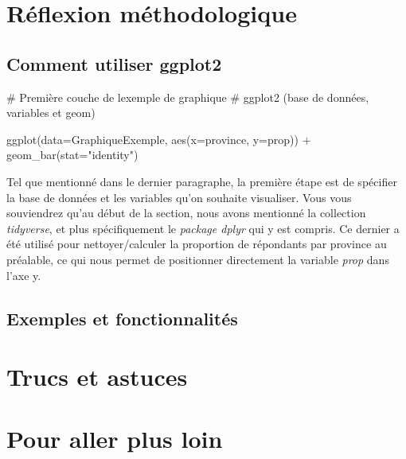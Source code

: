 \documentclass[
  letterpaper,
]{scrbook}
\newenvironment{Shaded}{\begin{snugshade}}{\end{snugshade}}
\newcommand{\AttributeTok}[1]{\textcolor[rgb]{0.40,0.45,0.13}{#1}}
\newcommand{\CommentTok}[1]{\textcolor[rgb]{0.37,0.37,0.37}{#1}}
\newcommand{\FunctionTok}[1]{\textcolor[rgb]{0.28,0.35,0.67}{#1}}
\newcommand{\NormalTok}[1]{\textcolor[rgb]{0.00,0.23,0.31}{#1}}
\newcommand{\SpecialCharTok}[1]{\textcolor[rgb]{0.37,0.37,0.37}{#1}}
\newcommand{\StringTok}[1]{\textcolor[rgb]{0.13,0.47,0.30}{#1}}
\begin{document}
\hypertarget{ruxe9flexion-muxe9thodologique}{%
\section{Réflexion
méthodologique}\label{ruxe9flexion-muxe9thodologique}}

\hypertarget{comment-utiliser-ggplot2}{%
\subsection{Comment utiliser ggplot2}\label{comment-utiliser-ggplot2}}

\begin{Shaded}
\begin{Highlighting}[]
\CommentTok{\# Première couche de l\textquotesingle{}exemple de graphique}
\CommentTok{\# ggplot2 (base de données, variables et geom)}

\FunctionTok{ggplot}\NormalTok{(}\AttributeTok{data=}\NormalTok{GraphiqueExemple, }\FunctionTok{aes}\NormalTok{(}\AttributeTok{x=}\NormalTok{province, }\AttributeTok{y=}\NormalTok{prop)) }\SpecialCharTok{+}
  \FunctionTok{geom\_bar}\NormalTok{(}\AttributeTok{stat=}\StringTok{"identity"}\NormalTok{) }
\end{Highlighting}
\end{Shaded}

Tel que mentionné dans le dernier paragraphe, la première étape est de
spécifier la base de données et les variables qu'on souhaite visualiser.
Vous vous souviendrez qu'au début de la section, nous avons mentionné la
collection \emph{tidyverse}, et plus spécifiquement le \emph{package
dplyr} qui y est compris. Ce dernier a été utilisé pour
nettoyer/calculer la proportion de répondants par province au préalable,
ce qui nous permet de positionner directement la variable \emph{prop}
dans l'axe y.

\hypertarget{exemples-et-fonctionnalituxe9s}{%
\subsection{Exemples et
fonctionnalités}\label{exemples-et-fonctionnalituxe9s}}

\hypertarget{trucs-et-astuces}{%
\section{Trucs et astuces}\label{trucs-et-astuces}}

\hypertarget{pour-aller-plus-loin}{%
\section{Pour aller plus loin}\label{pour-aller-plus-loin}}
\end{document}
